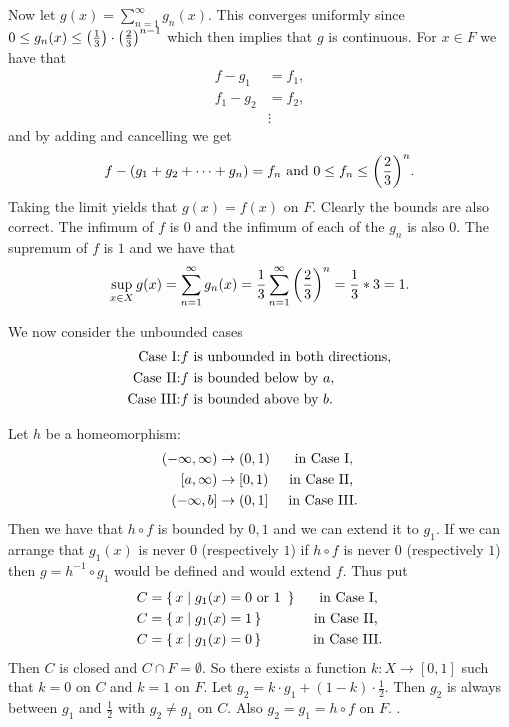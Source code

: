 \documentclass[letterpaper, 11pt, oneside]{book}
\begin{document}
\begin{pf}
  \clearpage

  Now let $g(x) = \sum_{n = 1}^{\infty} g_{n}(x)$.
  This converges uniformly since $0 \leq g_{n}(x) \leq \pqty{\frac{1}{3}} \cdot\pqty{\frac{2}{3}}^{n - 1}$ which then implies that $g$ is continuous.
  For $x \in F$ we have that
  \begin{align*}
    f - g_{1}     &= f_{1}, \\
    f_{1} - g_{2} &= f_{2}, \\
                  &\vdots
  \end{align*}
  and by adding and cancelling we get
  \[
    f - (g_{1} + g_{2} + \cdots + g_{n}) = f_{n} \text{ and } 0 \leq f_{n} \leq \pqty{\frac{2}{3}}^{n}.
  \]
  Taking the limit yields that $g(x) = f(x)$ on $F$.
  Clearly the bounds are also correct.
  The infimum of $f$ is $0$ and the infimum of each of the $g_{n}$ is also $0$.
  The supremum of $f$ is $1$ and we have that
  \[
    \sup_{x \in X} g(x) = \sum_{n = 1}^{\infty} g_{n}(x) = \frac{1}{3} \sum_{n = 1}^{\infty} \pqty{\frac{2}{3}}^{n} = \frac{1}{3} * 3 = 1.
  \]

  We now consider the unbounded cases
  \begin{align*}
   \text{Case I:\@}   &f \text{ is unbounded in both directions}, \\
   \text{Case II:\@}  &f \text{ is bounded below by } a, \\
   \text{Case III:\@} &f \text{ is bounded above by } b.
  \end{align*}

  Let $h$ be a homeomorphism:
  \begin{align*}
    (-\infty, \infty) &\to (0, 1) &\text{ in Case I, }  \\
    [a, \infty)       &\to [0, 1) &\text{ in Case II, } \\
    (-\infty, b]      &\to (0, 1] &\text{ in Case III.\@}
  \end{align*}
  Then we have that $h \circ f$ is bounded by $0, 1$ and we can extend it to $g_{1}$.
  If we can arrange that $g_{1}(x)$ is never $0$ (respectively $1$) if $h \circ f$ is never $0$ (respectively $1$) then $g = h^{-1} \circ g_{1}$ would be defined and would extend $f$.
  Thus put
  \begin{align*}
    C &= \set{x | g_{1}(x) = 0 \text{ or 1 }} &\text{ in Case I, }  \\
    C &= \set{x | g_{1}(x) = 1 } &\text{ in Case II, } \\
    C &= \set{x | g_{1}(x) = 0 } &\text{ in Case III.\@}
  \end{align*}
  Then $C$ is closed and $C \cap F = \emptyset$.
  So there exists a function $k\colon X \to [0, 1]$ such that $k = 0$ on $C$ and $k = 1$ on $F$.
  Let $g_{2} = k \cdot g_{1} + (1 - k) \cdot \frac{1}{2}$.
  Then $g_{2}$ is always between $g_{1}$ and $\frac{1}{2}$ with $g_{2} \neq g_{1}$ on $C$.
  Also $g_{2} = g_{1} = h \circ f$ on $F$.
  .
\end{pf}
\end{document}
